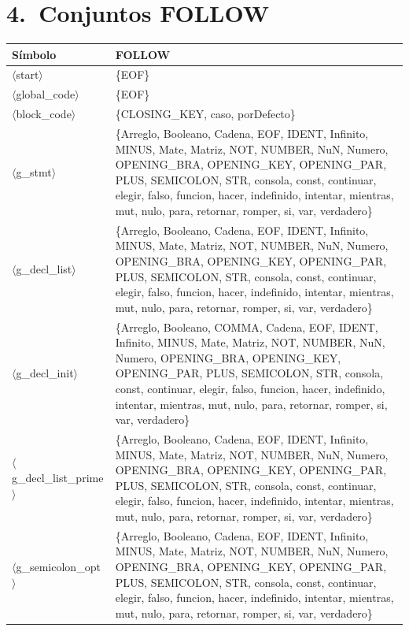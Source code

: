 \documentclass[10pt]{article}
\begin{document}
\section*{4.\ Conjuntos FOLLOW}
{\footnotesize
\begin{longtable}{@{} p{3.5cm} p{13cm} @{}}
  \toprule
  \textbf{Símbolo} & \textbf{FOLLOW} \\
  \midrule \endhead
  \parbox[t]{3.3cm}{\raggedright$\langle$start$\rangle$} & \{EOF\} \\
  \parbox[t]{3.3cm}{\raggedright$\langle$global\_\allowbreak{}code$\rangle$} & \{EOF\} \\
  \parbox[t]{3.3cm}{\raggedright$\langle$block\_\allowbreak{}code$\rangle$} & \{CLOSING\_KEY, caso, porDefecto\} \\
  \parbox[t]{3.3cm}{\raggedright$\langle$g\_\allowbreak{}stmt$\rangle$} & \{Arreglo, Booleano, Cadena, EOF, IDENT, Infinito, MINUS, Mate, Matriz, NOT, NUMBER, NuN, Numero, OPENING\_BRA, OPENING\_KEY, OPENING\_PAR, PLUS, SEMICOLON, STR, consola, const, continuar, elegir, falso, funcion, hacer, indefinido, intentar, mientras, mut, nulo, para, retornar, romper, si, var, verdadero\} \\
  \parbox[t]{3.3cm}{\raggedright$\langle$g\_\allowbreak{}decl\_\allowbreak{}list$\rangle$} & \{Arreglo, Booleano, Cadena, EOF, IDENT, Infinito, MINUS, Mate, Matriz, NOT, NUMBER, NuN, Numero, OPENING\_BRA, OPENING\_KEY, OPENING\_PAR, PLUS, SEMICOLON, STR, consola, const, continuar, elegir, falso, funcion, hacer, indefinido, intentar, mientras, mut, nulo, para, retornar, romper, si, var, verdadero\} \\
  \parbox[t]{3.3cm}{\raggedright$\langle$g\_\allowbreak{}decl\_\allowbreak{}init$\rangle$} & \{Arreglo, Booleano, COMMA, Cadena, EOF, IDENT, Infinito, MINUS, Mate, Matriz, NOT, NUMBER, NuN, Numero, OPENING\_BRA, OPENING\_KEY, OPENING\_PAR, PLUS, SEMICOLON, STR, consola, const, continuar, elegir, falso, funcion, hacer, indefinido, intentar, mientras, mut, nulo, para, retornar, romper, si, var, verdadero\} \\
  \parbox[t]{3.3cm}{\raggedright$\langle$g\_\allowbreak{}decl\_\allowbreak{}list\_\allowbreak{}prime$\rangle$} & \{Arreglo, Booleano, Cadena, EOF, IDENT, Infinito, MINUS, Mate, Matriz, NOT, NUMBER, NuN, Numero, OPENING\_BRA, OPENING\_KEY, OPENING\_PAR, PLUS, SEMICOLON, STR, consola, const, continuar, elegir, falso, funcion, hacer, indefinido, intentar, mientras, mut, nulo, para, retornar, romper, si, var, verdadero\} \\
  \parbox[t]{3.3cm}{\raggedright$\langle$g\_\allowbreak{}semicolon\_\allowbreak{}opt$\rangle$} & \{Arreglo, Booleano, Cadena, EOF, IDENT, Infinito, MINUS, Mate, Matriz, NOT, NUMBER, NuN, Numero, OPENING\_BRA, OPENING\_KEY, OPENING\_PAR, PLUS, SEMICOLON, STR, consola, const, continuar, elegir, falso, funcion, hacer, indefinido, intentar, mientras, mut, nulo, para, retornar, romper, si, var, verdadero\} \\

\end{longtable}}
\end{document}
